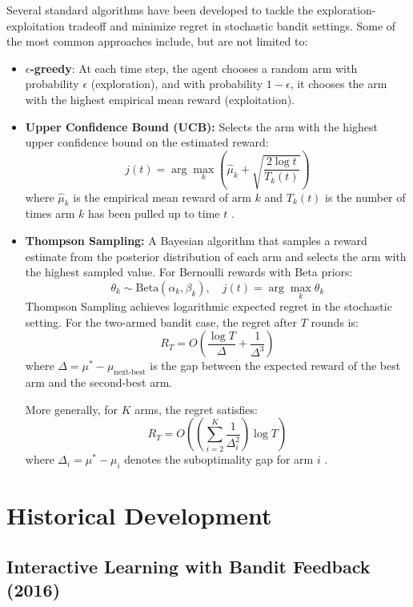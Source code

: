 \documentclass[11pt]{article}
\begin{document}
Several standard algorithms have been developed to tackle the exploration-exploitation tradeoff and minimize regret in stochastic bandit settings. Some of the most common approaches include, but are not limited to:
\begin{itemize}
    \item \textbf{$\epsilon$-greedy}: At each time step, the agent chooses a random arm with probability $\epsilon$ (exploration), and with probability $1 - \epsilon$, it chooses the arm with the highest empirical mean reward (exploitation).

    \item \textbf{Upper Confidence Bound (UCB):} Selects the arm with the highest upper confidence bound on the estimated reward:
    $$ 
    j(t) = \arg\max_k \left( \hat{\mu}_k + \sqrt{\frac{2 \log t}{T_k(t)}} \right)
    $$
    where $\hat{\mu}_k$ is the empirical mean reward of arm $k$ and $T_k(t)$ is the number of times arm $k$ has been pulled up to time $t$ \cite{KuleshovPrecup2000}.

    \item \textbf{Thompson Sampling:} A Bayesian algorithm that samples a reward estimate from the posterior distribution of each arm and selects the arm with the highest sampled value. For Bernoulli rewards with Beta priors:
    $$
    \theta_k \sim \text{Beta}(\alpha_k, \beta_k), \quad j(t) = \arg\max_k \theta_k
    $$
    Thompson Sampling achieves logarithmic expected regret in the stochastic setting. For the two-armed bandit case, the regret after $T$ rounds is:
    $$
    R_T = O\left( \frac{\log T}{\Delta} + \frac{1}{\Delta^3} \right)
    $$
    where $\Delta = \mu^* - \mu_{\text{next-best}}$ is the gap between the expected reward of the best arm and the second-best arm.
    
    More generally, for $K$ arms, the regret satisfies:
    $$
    R_T = O\left( \left( \sum_{i=2}^K \frac{1}{\Delta_i^2} \right) \log T \right)
    $$
    where $\Delta_i = \mu^* - \mu_i$ denotes the suboptimality gap for arm $i$ \cite{AgarwalGoyal2012}.
    
\end{itemize}

\section{Historical Development}

\subsection{Interactive Learning with Bandit Feedback (2016)}
\end{document}
